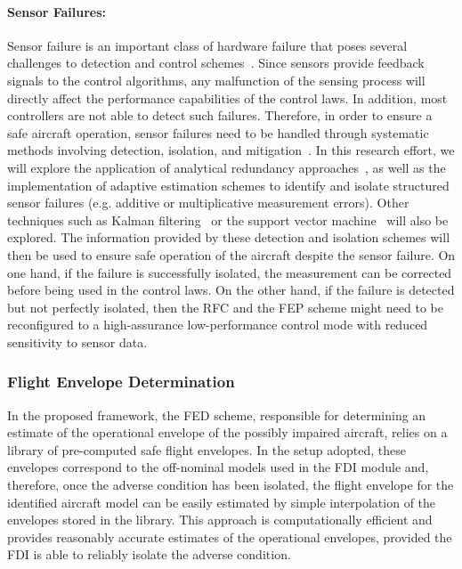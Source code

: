 \documentclass[letter,onecolumn,12pt]{aiaa-tc}
\begin{document}
\paragraph{Sensor Failures:} Sensor failure is an important class of hardware failure that poses several challenges to detection and control schemes~\cite{willsky1976survey,akyildiz2002survey}. Since sensors provide feedback signals to the control algorithms, any malfunction of the sensing process will directly affect the performance capabilities of the control laws. In addition, most controllers are not able to detect such failures. Therefore, in order to ensure a safe aircraft operation, sensor failures need to be handled through systematic methods involving detection, isolation, and mitigation~\cite{naidu1990use,guo1991sensor,napolitano1995neural}. In this research effort, we will explore the application of analytical redundancy approaches~\cite{randell1975system,chow1984analytical,ammann1988data,eckhardt1991experimental,maybeck1999multiple}, as well as the implementation of adaptive estimation schemes to identify and isolate structured sensor failures (e.g. additive or multiplicative measurement errors). Other techniques such as Kalman filtering~\cite{welch1995introduction} or the support vector machine~\cite{suykens1999least} will also be explored. The information provided by these detection and isolation schemes will then be used to ensure safe operation of the aircraft despite the sensor failure. On one hand, if the failure is successfully isolated, the measurement can be corrected before being used in the control laws. On the other hand, if the failure is detected but not perfectly isolated, then the RFC and the FEP scheme might need to be reconfigured to a high-assurance low-performance control mode with reduced sensitivity to sensor data.



\subsubsection{Flight Envelope Determination}

In the proposed framework, the FED scheme, responsible for determining an estimate of the operational envelope of the possibly impaired aircraft, relies on a library of pre-computed safe flight envelopes. In the setup adopted, these envelopes correspond to the off-nominal models used in the FDI module and, therefore, once the adverse condition has been isolated, the flight envelope for the identified aircraft model can be easily estimated by simple interpolation of the envelopes stored in the library. This approach is computationally efficient and provides reasonably accurate estimates of the operational envelopes, provided the FDI is able to reliably isolate the adverse condition.
\end{document}
